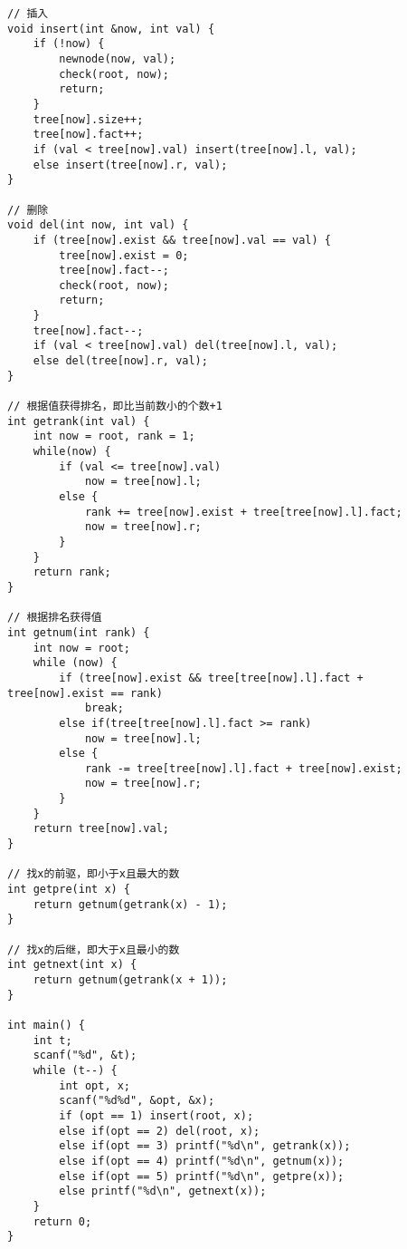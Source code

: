\begin{lstlisting}
// 插入
void insert(int &now, int val) {
	if (!now) {
		newnode(now, val);
		check(root, now);
		return;
	}
	tree[now].size++;
	tree[now].fact++;
	if (val < tree[now].val) insert(tree[now].l, val);
	else insert(tree[now].r, val);
}

// 删除
void del(int now, int val) {
	if (tree[now].exist && tree[now].val == val) {
		tree[now].exist = 0;
		tree[now].fact--;
		check(root, now);
		return;
	}
	tree[now].fact--;
	if (val < tree[now].val) del(tree[now].l, val);
	else del(tree[now].r, val);
}

// 根据值获得排名，即比当前数小的个数+1
int getrank(int val) {
	int now = root, rank = 1;
	while(now) {
		if (val <= tree[now].val)
			now = tree[now].l;
		else {
			rank += tree[now].exist + tree[tree[now].l].fact;
			now = tree[now].r;
		}
	}
	return rank;
}

// 根据排名获得值
int getnum(int rank) {
	int now = root;
	while (now) {
		if (tree[now].exist && tree[tree[now].l].fact + tree[now].exist == rank)
			break;
		else if(tree[tree[now].l].fact >= rank)
			now = tree[now].l;
		else {
			rank -= tree[tree[now].l].fact + tree[now].exist;
			now = tree[now].r;
		}
	}
	return tree[now].val;
}

// 找x的前驱，即小于x且最大的数
int getpre(int x) {
	return getnum(getrank(x) - 1);
}

// 找x的后继，即大于x且最小的数
int getnext(int x) {
	return getnum(getrank(x + 1));
}

int main() {
	int t;
	scanf("%d", &t);
	while (t--) {
		int opt, x;
		scanf("%d%d", &opt, &x);
		if (opt == 1) insert(root, x);
		else if(opt == 2) del(root, x);
		else if(opt == 3) printf("%d\n", getrank(x));
		else if(opt == 4) printf("%d\n", getnum(x));
		else if(opt == 5) printf("%d\n", getpre(x));
		else printf("%d\n", getnext(x));
	}
	return 0;
}
\end{lstlisting}


